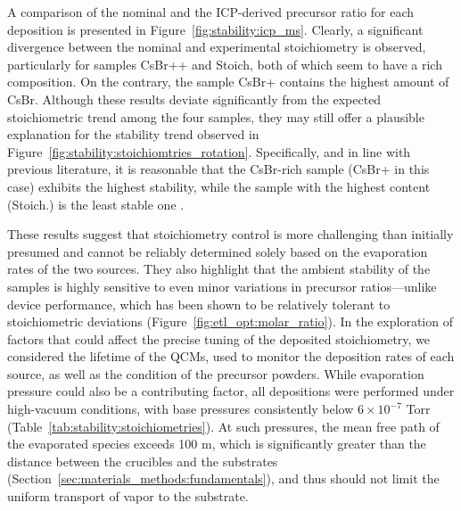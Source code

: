 A comparison of the nominal and the ICP-derived precursor ratio for each deposition is presented in Figure~\ref{fig:stability:icp_ms}. Clearly, a significant divergence between the nominal and experimental stoichiometry is observed, particularly for samples CsBr++ and Stoich, both of which seem to have a  rich composition. On the contrary, the sample CsBr+ contains the highest amount of CsBr. Although these results deviate significantly from the expected stoichiometric trend among the four samples, they may still offer a plausible explanation for the stability trend observed in Figure~\ref{fig:stability:stoichiomtries_rotation}. Specifically, and in line with previous literature, it is reasonable that the CsBr-rich sample (CsBr+ in this case) exhibits the highest stability, while the sample with the highest  content (Stoich.) is the least stable one \cite{Ma2017TheCells}.

These results suggest that stoichiometry control is more challenging than initially presumed and cannot be reliably determined solely based on the evaporation rates of the two sources. They also highlight that the ambient stability of the samples is highly sensitive to even minor variations in precursor ratios—unlike device performance, which has been shown to be relatively tolerant to stoichiometric deviations (Figure~\ref{fig:etl_opt:molar_ratio}). In the exploration of factors that could affect the precise tuning of the deposited stoichiometry, we considered the lifetime of the QCMs, used to monitor the deposition rates of each source, as well as the condition of the precursor powders. While evaporation pressure could also be a contributing factor, all depositions were performed under high-vacuum conditions, with base pressures consistently below $6 \times 10^{-7}$ Torr (Table~\ref{tab:stability:stoichiometries}). At such pressures, the mean free path of the evaporated species exceeds 100 m, which is significantly greater than the distance between the crucibles and the substrates (Section~\ref{sec:materials_methods:fundamentals}), and thus should not limit the uniform transport of vapor to the substrate.

